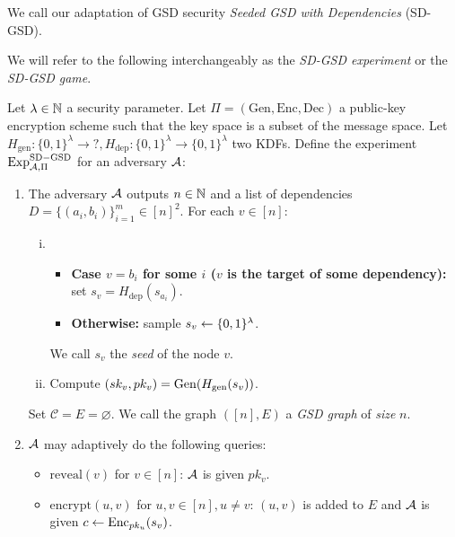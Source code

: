 We call our adaptation of GSD security \emph{Seeded GSD with Dependencies} (SD-GSD).


We will refer to the following interchangeably as the \emph{SD-GSD experiment} or the \emph{SD-GSD game}.


\begin{definition}

	Let $\lambda \in \mathbb{N}$ a security parameter.  Let $\Pi = (\mathrm{Gen}, \mathrm{Enc}, \mathrm{Dec})$ a public-key encryption scheme such that the key space is a subset of the message space. Let $H_{\mathrm{gen}} \colon \{0, 1\}^\lambda \to ?, H_{\mathrm{dep}} \colon \{0, 1\}^\lambda \to \{0, 1\}^\lambda$ two KDFs. Define the experiment $\mathrm{Exp}_{\mathcal{A}, \Pi}^{\mathrm{SD-GSD}}$ for an adversary $\mathcal{A}$:
	\begin{enumerate}[1.]
		\item The adversary $\mathcal{A}$ outputs $n \in \mathbb{N}$ and a list of dependencies $D = \{(a_{i}, b_{i})\}_{i=1}^m \in [n]^2$. For each $v \in [n]$:
		      \begin{enumerate}[(i)]
			      \item \begin{itemize}
				            \item \textbf{Case $v = b_i$ for some $i$ ($v$ is the target of some dependency):} set $s_v = H_{\mathrm{dep}}(s_{a_i})$.
				            \item \textbf{Otherwise:} sample $s_v \leftarrow \{0, 1\}^\lambda$.
			            \end{itemize}
			            We call $s_v$ the \emph{seed} of the node $v$.
			      \item Compute $(sk_v, pk_v) = \mathrm{Gen}(H_\mathrm{gen}(s_v))$. 
		      \end{enumerate}
		      Set $\mathcal{C} = E = \varnothing$. We call the graph $([n], E)$ a \emph{GSD graph} of \emph{size} $n$.
		\item $\mathcal{A}$ may adaptively do the following queries:
		      \begin{itemize}
			      \item $\mathrm{reveal}(v)$ for $v \in [n]$: $\mathcal{A}$ is given $pk_v$.
			      \item $\mathrm{encrypt}(u, v)$ for $u, v \in [n], u \neq v$: $(u, v)$ is added to $E$ and $\mathcal{A}$ is given $c \leftarrow \mathrm{Enc}_{pk_u}(s_v)$.

\end{itemize}
\end{enumerate}
\end{definition}
